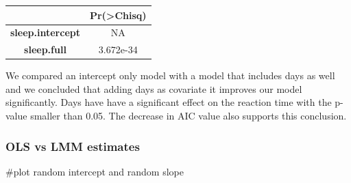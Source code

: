 \documentclass[
]{article}
\begin{document}
\begin{longtable}[]{@{}cc@{}}
\toprule
\begin{minipage}[b]{0.29\columnwidth}\centering
~\strut
\end{minipage} & \begin{minipage}[b]{0.17\columnwidth}\centering
Pr(\textgreater Chisq)\strut
\end{minipage}\tabularnewline
\midrule
\endhead
\begin{minipage}[t]{0.29\columnwidth}\centering
\textbf{sleep.intercept}\strut
\end{minipage} & \begin{minipage}[t]{0.17\columnwidth}\centering
NA\strut
\end{minipage}\tabularnewline
\begin{minipage}[t]{0.29\columnwidth}\centering
\textbf{sleep.full}\strut
\end{minipage} & \begin{minipage}[t]{0.17\columnwidth}\centering
3.672e-34\strut
\end{minipage}\tabularnewline
\bottomrule
\end{longtable}

We compared an intercept only model with a model that includes days as
well and we concluded that adding days as covariate it improves our
model significantly. Days have have a significant effect on the reaction
time with the p-value smaller than 0.05. The decrease in AIC value also
supports this conclusion.

\hypertarget{ols-vs-lmm-estimates}{%
\subsubsection{OLS vs LMM estimates}\label{ols-vs-lmm-estimates}}

\#plot random intercept and random slope
\end{document}
